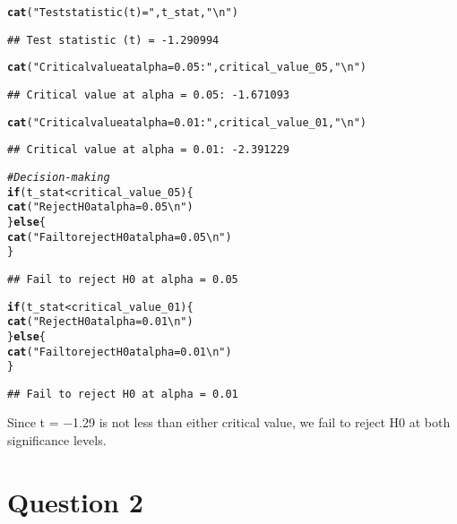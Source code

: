 \documentclass{article}\usepackage[]{graphicx}\usepackage[]{xcolor}
\makeatletter
\newcommand{\hlsng}[1]{\textcolor[rgb]{0.192,0.494,0.8}{#1}}%
\newcommand{\hlcom}[1]{\textcolor[rgb]{0.678,0.584,0.686}{\textit{#1}}}%
\newcommand{\hlopt}[1]{\textcolor[rgb]{0,0,0}{#1}}%
\newcommand{\hldef}[1]{\textcolor[rgb]{0.345,0.345,0.345}{#1}}%
\newcommand{\hlkwa}[1]{\textcolor[rgb]{0.161,0.373,0.58}{\textbf{#1}}}%
\newcommand{\hlkwd}[1]{\textcolor[rgb]{0.737,0.353,0.396}{\textbf{#1}}}%
\newenvironment{kframe}{%
 \def\at@end@of@kframe{}%
 \ifinner\ifhmode%
  \def\at@end@of@kframe{\end{minipage}}%
  \begin{minipage}{\columnwidth}%
 \fi\fi%
 \def\FrameCommand##1{\hskip\@totalleftmargin \hskip-\fboxsep
 \colorbox{shadecolor}{##1}\hskip-\fboxsep
     \hskip-\linewidth \hskip-\@totalleftmargin \hskip\columnwidth}%
 \MakeFramed {\advance\hsize-\width
   \@totalleftmargin\z@ \linewidth\hsize
   \@setminipage}}%
 {\par\unskip\endMakeFramed%
 \at@end@of@kframe}
\newenvironment{knitrout}{}{} %
\makeatother
\begin{document}
\begin{knitrout}
\begin{kframe}
\begin{alltt}
\hlkwd{cat}\hldef{(}\hlsng{"Test statistic (t) ="}\hldef{, t_stat,} \hlsng{"\textbackslash{}n"}\hldef{)}
\end{alltt}
\begin{verbatim}
## Test statistic (t) = -1.290994
\end{verbatim}
\begin{alltt}
\hlkwd{cat}\hldef{(}\hlsng{"Critical value at alpha = 0.05:"}\hldef{, critical_value_05,} \hlsng{"\textbackslash{}n"}\hldef{)}
\end{alltt}
\begin{verbatim}
## Critical value at alpha = 0.05: -1.671093
\end{verbatim}
\begin{alltt}
\hlkwd{cat}\hldef{(}\hlsng{"Critical value at alpha = 0.01:"}\hldef{, critical_value_01,} \hlsng{"\textbackslash{}n"}\hldef{)}
\end{alltt}
\begin{verbatim}
## Critical value at alpha = 0.01: -2.391229
\end{verbatim}
\begin{alltt}
\hlcom{# Decision-making}
\hlkwa{if} \hldef{(t_stat} \hlopt{<} \hldef{critical_value_05) \{}
  \hlkwd{cat}\hldef{(}\hlsng{"Reject H0 at alpha = 0.05\textbackslash{}n"}\hldef{)}
\hldef{\}} \hlkwa{else} \hldef{\{}
  \hlkwd{cat}\hldef{(}\hlsng{"Fail to reject H0 at alpha = 0.05\textbackslash{}n"}\hldef{)}
\hldef{\}}
\end{alltt}
\begin{verbatim}
## Fail to reject H0 at alpha = 0.05
\end{verbatim}
\begin{alltt}
\hlkwa{if} \hldef{(t_stat} \hlopt{<} \hldef{critical_value_01) \{}
  \hlkwd{cat}\hldef{(}\hlsng{"Reject H0 at alpha = 0.01\textbackslash{}n"}\hldef{)}
\hldef{\}} \hlkwa{else} \hldef{\{}
  \hlkwd{cat}\hldef{(}\hlsng{"Fail to reject H0 at alpha = 0.01\textbackslash{}n"}\hldef{)}
\hldef{\}}
\end{alltt}
\begin{verbatim}
## Fail to reject H0 at alpha = 0.01
\end{verbatim}
\end{kframe}
\end{knitrout}
Since t = −1.29 is not less than either critical value, we fail to reject H0 at both significance levels.

\section{Question 2}
\end{document}
